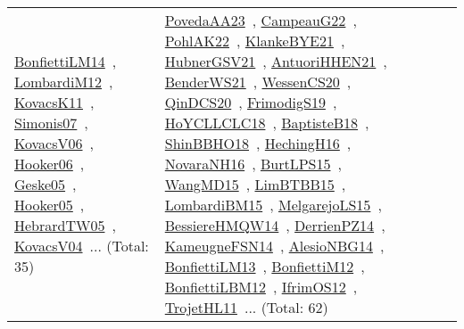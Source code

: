 {\begin{longtable}{lp{3cm}>{\raggedright\arraybackslash}p{6cm}>{\raggedright\arraybackslash}p{6cm}>{\raggedright\arraybackslash}p{8cm}}
\href{papers/BonfiettiLM14.pdf}{BonfiettiLM14}~\cite{BonfiettiLM14}, \href{articles/LombardiM12.pdf}{LombardiM12}~\cite{LombardiM12}, \href{articles/KovacsK11.pdf}{KovacsK11}~\cite{KovacsK11}, \href{articles/Simonis07.pdf}{Simonis07}~\cite{Simonis07}, \href{papers/KovacsV06.pdf}{KovacsV06}~\cite{KovacsV06}, \href{articles/Hooker06.pdf}{Hooker06}~\cite{Hooker06}, \href{papers/Geske05.pdf}{Geske05}~\cite{Geske05}, \href{articles/Hooker05.pdf}{Hooker05}~\cite{Hooker05}, \href{papers/HebrardTW05.pdf}{HebrardTW05}~\cite{HebrardTW05}, \href{papers/KovacsV04.pdf}{KovacsV04}~\cite{KovacsV04}... (Total: 35) & \href{papers/PovedaAA23.pdf}{PovedaAA23}~\cite{PovedaAA23}, \href{articles/CampeauG22.pdf}{CampeauG22}~\cite{CampeauG22}, \href{articles/PohlAK22.pdf}{PohlAK22}~\cite{PohlAK22}, \href{papers/KlankeBYE21.pdf}{KlankeBYE21}~\cite{KlankeBYE21}, \href{articles/HubnerGSV21.pdf}{HubnerGSV21}~\cite{HubnerGSV21}, \href{papers/AntuoriHHEN21.pdf}{AntuoriHHEN21}~\cite{AntuoriHHEN21}, \href{papers/BenderWS21.pdf}{BenderWS21}~\cite{BenderWS21}, \href{papers/WessenCS20.pdf}{WessenCS20}~\cite{WessenCS20}, \href{articles/QinDCS20.pdf}{QinDCS20}~\cite{QinDCS20}, \href{papers/FrimodigS19.pdf}{FrimodigS19}~\cite{FrimodigS19}, \href{papers/HoYCLLCLC18.pdf}{HoYCLLCLC18}~\cite{HoYCLLCLC18}, \href{articles/BaptisteB18.pdf}{BaptisteB18}~\cite{BaptisteB18}, \href{articles/ShinBBHO18.pdf}{ShinBBHO18}~\cite{ShinBBHO18}, \href{papers/HechingH16.pdf}{HechingH16}~\cite{HechingH16}, \href{articles/NovaraNH16.pdf}{NovaraNH16}~\cite{NovaraNH16}, \href{papers/BurtLPS15.pdf}{BurtLPS15}~\cite{BurtLPS15}, \href{articles/WangMD15.pdf}{WangMD15}~\cite{WangMD15}, \href{papers/LimBTBB15.pdf}{LimBTBB15}~\cite{LimBTBB15}, \href{papers/LombardiBM15.pdf}{LombardiBM15}~\cite{LombardiBM15}, \href{papers/MelgarejoLS15.pdf}{MelgarejoLS15}~\cite{MelgarejoLS15}, \href{papers/BessiereHMQW14.pdf}{BessiereHMQW14}~\cite{BessiereHMQW14}, \href{papers/DerrienPZ14.pdf}{DerrienPZ14}~\cite{DerrienPZ14}, \href{articles/KameugneFSN14.pdf}{KameugneFSN14}~\cite{KameugneFSN14}, \href{papers/AlesioNBG14.pdf}{AlesioNBG14}~\cite{AlesioNBG14}, \href{papers/BonfiettiLM13.pdf}{BonfiettiLM13}~\cite{BonfiettiLM13}, \href{papers/BonfiettiM12.pdf}{BonfiettiM12}~\cite{BonfiettiM12}, \href{papers/BonfiettiLBM12.pdf}{BonfiettiLBM12}~\cite{BonfiettiLBM12}, \href{papers/IfrimOS12.pdf}{IfrimOS12}~\cite{IfrimOS12}, \href{articles/TrojetHL11.pdf}{TrojetHL11}~\cite{TrojetHL11}... (Total: 62)\\

\end{longtable}}
